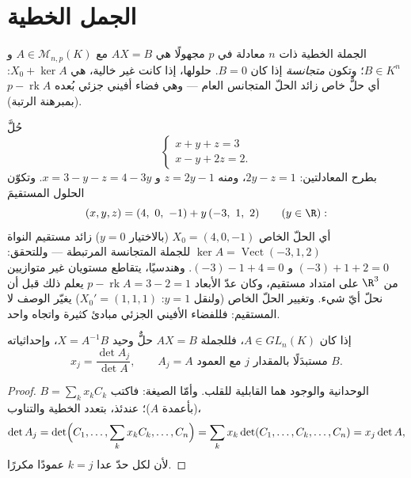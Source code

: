 \section{الجمل الخطية}

\begin{definition}\label{def:b1:det:system}
الجملة الخطية ذات $n$ معادلة في $p$
مجهولًا هي $AX = B$ مع $A \in \mathcal{M}_{n,p}(K)$ و $B \in
K^n$؛ وتكون \emph{متجانسة} إذا كان $B = 0$.  حلولها، إذا كانت
غير خالية، هي $X_0 + \ker A$: أي حلٌّ خاص زائد الحلّ المتجانس
العام --- وهي فضاء أفيني جزئي بُعده $p -
\operatorname{rk} A$ (بمبرهنة الرتبة).
\end{definition}

\begin{example}
\label{ex:b1:det:affinestructure}
حُلَّ
\[
\begin{cases}
x + y + z = 3\\
x - y + 2z = 2 .
\end{cases}
\]
بطرح المعادلتين: $2y - z = 1$، ومنه $z = 2y - 1$ و $x =
3 - y - z = 4 - 3y$. وتكوّن الحلول المستقيمَ
\[
(x, y, z) = (4,\ 0,\ -1) + y\,(-3,\ 1,\ 2)
\qquad (y \in \R):
\]
أي الحلّ الخاص $X_0 = (4, 0, -1)$ (بالاختيار $y = 0$)
زائد مستقيم النواة $\ker A = \operatorname{Vect}(-3, 1, 2)$ للجملة
المتجانسة المرتبطة --- وللتحقق: $(-3) + 1 + 2 = 0$
و $(-3) - 1 + 4 = 0$. وهندسيًا، يتقاطع مستويان غير متوازيين من
$\R^3$ على امتداد مستقيم، وكان عدّ الأبعاد $p -
\operatorname{rk} A = 3 - 2 = 1$ يعلم ذلك قبل أن نحلّ
أيّ شيء. وتغيير الحلّ الخاص (ولنقل $y = 1$: $X_0' =
(1, 1, 1)$) يغيّر الوصف لا المستقيم: فللفضاء الأفيني
الجزئي مبادئ كثيرة واتجاه واحد.
\end{example}

\begin{theorem}\label{thm:b1:det:cramer}
إذا كان $A \in GL_n(K)$، فللجملة $AX = B$ حلٌّ وحيد $X =
A^{-1}B$، وإحداثياته
\[
x_j = \frac{\det A_j}{\det A},
\qquad A_j = A \text{ مع العمود } j \text{ مستبدَلًا بالمقدار } B .
\]
\end{theorem}

\begin{proof}
الوحدانية والوجود هما القابلية للقلب. وأمّا الصيغة:
فاكتب $B = \sum_k x_k C_k$ (بأعمدة $A$)؛ عندئذ، بتعدد
الخطية والتناوب،
\[
\det A_j = \det\Bigl(C_1, \dots, \sum_k x_k C_k, \dots, C_n\Bigr)
= \sum_k x_k \det(C_1, \dots, C_k, \dots, C_n)
= x_j \det A ,
\]
لأن لكل حدّ عدا $k = j$ عمودًا مكررًا.
\end{proof}

